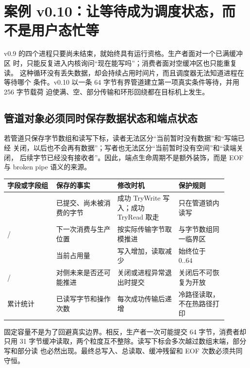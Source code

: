 \section{案例 v0.10：让等待成为调度状态，而不是用户态忙等}

v0.9 的四个进程只要尚未结束，就始终具有运行资格。生产者面对一个已满缓冲区
时，只能反复进入内核询问“现在能写吗”；消费者面对空缓冲区也只能重复读。
这种循环没有丢失数据，却会持续占用时间片，而且调度器无法知道进程在等待哪个
条件。v0.10 以一条 64 字节有界管道建立第一项真实条件等待，并用 256 字节载荷
迫使满、空、部分传输和环形回绕都在目标机上发生。

\subsection{管道对象必须同时保存数据状态和端点状态}

若管道只保存字节数组和读写下标，读者无法区分“当前暂时没有数据”和“写端已经
关闭，以后也不会再有数据”；写者也无法区分“当前暂时没有空间”和“读端关闭，
后续字节已经没有接收者”。因此，端点生命周期不是额外装饰，而是 EOF 与
broken pipe 语义的来源。

\begin{longtable}{|L{0.20\linewidth}|L{0.25\linewidth}|L{0.25\linewidth}|L{0.20\linewidth}|}
\toprule
字段或字段组 & 保存的事实 & 修改时机 & 保护规则 \\
\midrule
{} & 已提交、尚未被消费的字节 & 成功 TryWrite 写入；成功 TryRead 取走 & 只在管道锁内读写 \\\tablerowrule
{}/ & 下一次消费与生产位置 & 按实际传输字节取模推进 & 与字节数组同一临界区 \\\tablerowrule
{} & 当前占用量 & 写入增加，读取减少 & 始终位于 \(0..64\) \\\tablerowrule
{}/ & 对侧未来是否还可能推进 & 关闭或进程异常退出时提交 & 关闭后不可恢复为开放 \\\tablerowrule
累计统计 & 已读写字节和操作次数 & 每次成功传输后递增 & 冷路径读取，不在热路径打印 \\
\bottomrule
\end{longtable}

固定容量不是为了回避真实边界。相反，生产者一次可能提交 64 字节，消费者却只用
31 字节缓冲读取，两个粒度互不整除。读写下标会多次越过数组末端，部分写和部分读
也必然出现。最终总写入、总读取、缓冲残留和 EOF 次数必须共同守恒。

